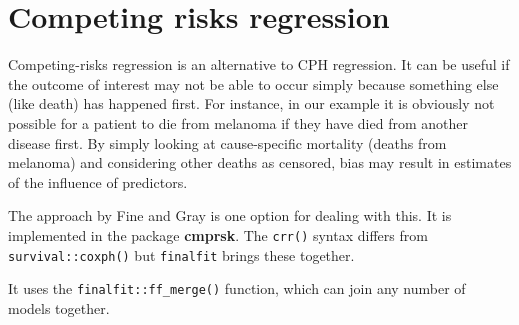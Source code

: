 \documentclass[
  12pt,
  krantz2]{krantz}
\begin{document}
\hypertarget{competing-risks-regression}{%
\section{Competing risks regression}\label{competing-risks-regression}}


Competing-risks regression is an alternative to CPH regression.
It can be useful if the outcome of interest may not be able to occur simply because something else (like death) has happened first.
For instance, in our example it is obviously not possible for a patient to die from melanoma if they have died from another disease first.
By simply looking at cause-specific mortality (deaths from melanoma) and considering other deaths as censored, bias may result in estimates of the influence of predictors.

The approach by Fine and Gray is one option for dealing with this.
It is implemented in the package \textbf{cmprsk}.
The \texttt{crr()} syntax differs from \texttt{survival::coxph()} but \texttt{finalfit} brings these together.

It uses the \texttt{finalfit::ff\_merge()} function, which can join any number of models together.
\end{document}
